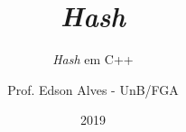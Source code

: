 \title{\textit{Hash}}
\subtitle{\textit{Hash} em C++}
\author{Prof. Edson Alves - UnB/FGA}
\date{2019}
